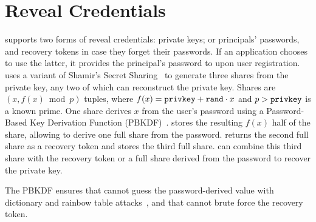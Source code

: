 %

\section{Reveal Credentials}
%
\sys supports two forms of reveal credentials: \one{} private keys; or
\two{} principals' passwords, and recovery
tokens in case they forget their passwords.
%
If an application chooses to use the latter, it provides the principal's password
to \sys upon user registration.
%
\sys uses a variant of Shamir's Secret Sharing~\cite{secretsharing}
to generate three shares from the private key, any two of which can reconstruct the
private key.
%
Shares are $(x, f(x) \bmod p)$ tuples, where $f(x) = \texttt{{privkey}} + \texttt{{rand}} \cdot
x$ and $p > \texttt{{privkey}}$ is a known prime.
%
One share derives $x$ from the user's password using a Password-Based Key
Derivation Function (PBKDF)~\cite{pbkdf-rfc}.
%
\sys stores the resulting $f(x)$ half of the share, allowing \sys to derive one
full share from the password.
%
%
\sys returns the second full share as a recovery token and stores the third full
share.
%
\sys can combine this third share with the recovery token
or a full share derived from the password to recover the
private key.
%

The PBKDF ensures that \sys cannot guess the password-derived value with
dictionary and rainbow table attacks~\cite{pbkdf}, and that \sys cannot brute force
the recovery token.
%
%

%
%


